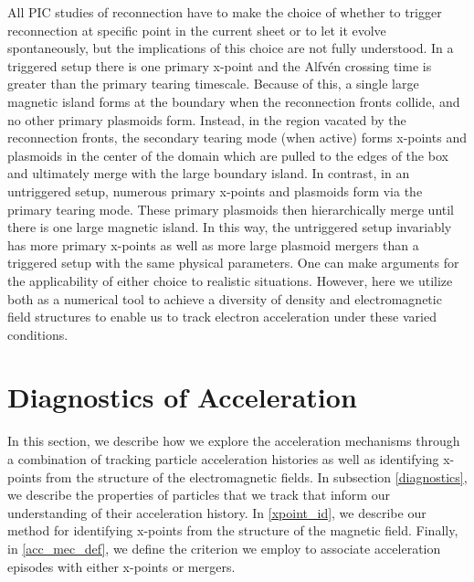 \documentclass[iop,twocolappendix]{emulateapj}
\begin{document}
All PIC studies of reconnection have to make the choice of whether to trigger reconnection at specific point in the current sheet or to let it evolve spontaneously, but the implications of this choice are not fully understood.  In a triggered setup there is one primary x-point and the Alfv\'en crossing time is greater than the primary tearing timescale.  Because of this, a single large magnetic island forms at the boundary when the reconnection fronts collide, and no other primary plasmoids form.  Instead, in the region vacated by the reconnection fronts, the secondary tearing mode (when active) forms x-points and plasmoids in the center of the domain which are pulled to the edges of the box and ultimately merge with the large boundary island.  In contrast, in an untriggered setup, numerous primary x-points and plasmoids form via the primary tearing mode.  These primary plasmoids then hierarchically merge until there is one large magnetic island.  In this way, the untriggered setup invariably has more primary x-points as well as more large plasmoid mergers than a triggered setup with the same physical parameters.  One can make arguments for the applicability of either choice to realistic situations.  However, here we utilize both as a numerical tool to achieve a diversity of density and electromagnetic field structures to enable us to track electron acceleration under these varied conditions.


\section{Diagnostics of Acceleration}
In this section, we describe how we explore the acceleration mechanisms through a combination of tracking particle acceleration histories as well as identifying x-points from the structure of the electromagnetic fields.  In subsection \ref{diagnostics}, we describe the properties of particles that we track that inform our understanding of their acceleration history.  In \ref{xpoint_id}, we describe our method for identifying x-points from the structure of the magnetic field.  Finally, in \ref{acc_mec_def}, we define the criterion we employ to associate acceleration episodes with either x-points or mergers.
\end{document}
